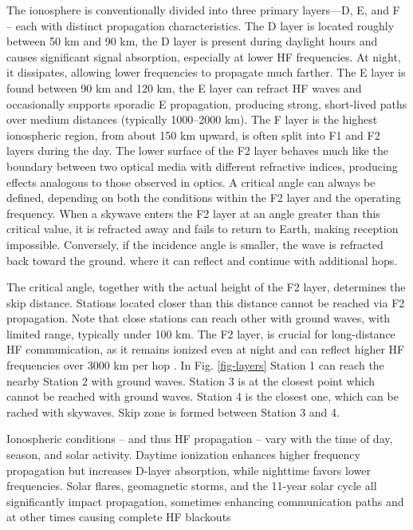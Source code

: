 \documentclass[signals,article,submit,pdftex,moreauthors]{Definitions/mdpi}
\begin{document}
The ionosphere is conventionally divided into three primary layers—D, E, and
F -- each with distinct propagation characteristics. The D layer is located
roughly between 50 km and 90 km, the D layer is present during daylight hours
and causes significant signal absorption, especially at lower HF frequencies.
At night, it dissipates, allowing lower frequencies to propagate much farther.
The E layer is found between 90 km and 120 km, the E layer can refract HF waves
and occasionally supports sporadic E propagation, producing strong, short-lived
paths over medium distances (typically 1000–2000 km). The F layer is the
highest ionospheric region, from about 150 km upward, is often split into F1
and F2 layers during the day.
The lower surface of the F2 layer behaves much like the boundary between two
optical media with different refractive indices, producing effects analogous to
those observed in optics. A critical angle can always be defined, depending on
both the conditions within the F2 layer and the operating frequency. When a
skywave enters the F2 layer at an angle greater than this critical value, it is
refracted away and fails to return to Earth, making reception impossible.
Conversely, if the incidence angle is smaller, the wave is refracted back
toward the ground. where it can reflect and
continue with additional hops.

The critical angle, together with the actual
height of the F2 layer, determines the skip distance. Stations located closer
than this distance cannot be reached via F2 propagation. Note that close stations
can reach other with ground waves, with limited range, typically under 100 km.
The F2 layer, is crucial for long-distance HF communication, as it remains
ionized even at night and can reflect higher HF frequencies over 3000 km per
hop \cite{lusis1983hf}.
In Fig. \ref{fig-layers} Station 1 can reach the nearby Station 2 with ground waves.
Station 3 is at the closest point which cannot be reached with ground waves. Station 4
is the closest one, which can be rached with skywaves. Skip zone is formed between
Station 3 and 4.

Ionospheric conditions -- and thus HF propagation -- vary with the time of day,
season, and solar activity. Daytime ionization enhances higher frequency
propagation but increases D-layer absorption, while nighttime favors lower
frequencies. Solar flares, geomagnetic storms, and the 11-year solar cycle all
significantly impact propagation, sometimes enhancing communication paths and
at other times causing complete HF blackouts
\cite{silver2011, cervera2021, hunsucker2007}
\end{document}
